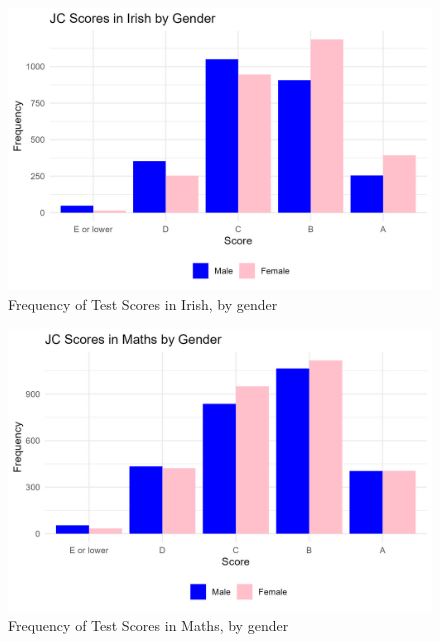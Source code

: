 \documentclass[a4paper]{article}
\begin{document}
\begin{figure}[htbp] 
    \centering
    \includegraphics[width=1\linewidth]{Frequency of Test Scores in Irish by Gender.jpeg}
    \caption{Frequency of Test Scores in Irish, by gender}
    \label{}
\end{figure}

\begin{figure}[htbp] 
    \centering
    \includegraphics[width=1\linewidth]{Frequency of Test Scores in Maths by Gender.jpeg}
    \caption{Frequency of Test Scores in Maths, by gender}
    \label{}
\end{figure}
\end{document}

